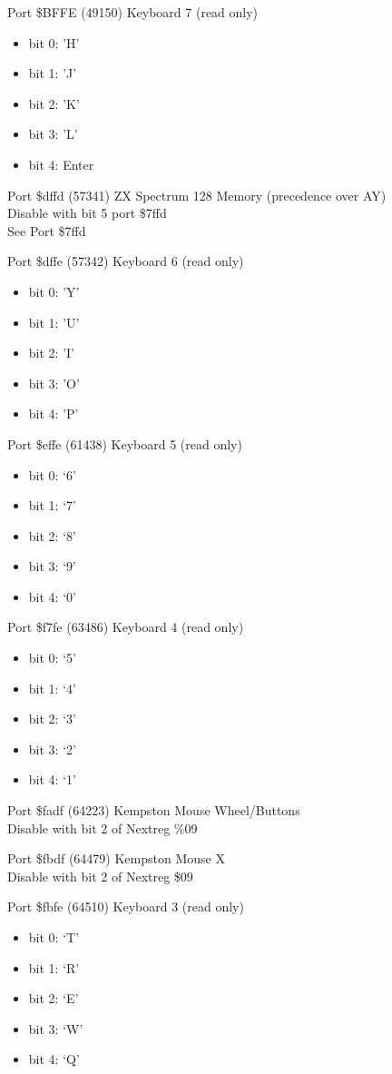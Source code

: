 Port \$BFFE (49150) Keyboard 7 (read only)
\begin{itemize}
\item[] bit 0: 'H'
\item[] bit 1: 'J'
\item[] bit 2: 'K'
\item[] bit 3: 'L'
\item[] bit 4: Enter
\end{itemize}

Port \$dffd (57341) ZX Spectrum 128 Memory (precedence over AY)\\
Disable with bit 5 port \$7ffd\\
See Port \$7ffd

Port \$dffe (57342) Keyboard 6 (read only)
\begin{itemize}
\item[] bit 0: 'Y'
\item[] bit 1: 'U'
\item[] bit 2: 'I'
\item[] bit 3: 'O'
\item[] bit 4: 'P'
\end{itemize}

Port \$effe (61438) Keyboard 5 (read only)
\begin{itemize}
\item[] bit 0: ‘6’
\item[] bit 1: ‘7’
\item[] bit 2: ‘8’
\item[] bit 3: ‘9’
\item[] bit 4: ‘0’
\end{itemize}

Port \$f7fe (63486) Keyboard 4 (read only)
\begin{itemize}
\item[] bit 0: ‘5’
\item[] bit 1: ‘4’
\item[] bit 2: ‘3’
\item[] bit 3: ‘2’
\item[] bit 4: ‘1’
\end{itemize}

Port \$fadf (64223) Kempston Mouse Wheel/Buttons\\
Disable with bit 2 of Nextreg \%09

Port \$fbdf (64479) Kempston Mouse X\\
Disable with bit 2 of Nextreg \$09

Port \$fbfe (64510) Keyboard 3 (read only)
\begin{itemize}
\item[] bit 0: ‘T’
\item[] bit 1: ‘R’
\item[] bit 2: ‘E’
\item[] bit 3: ‘W’
\item[] bit 4: ‘Q’
\end{itemize}

